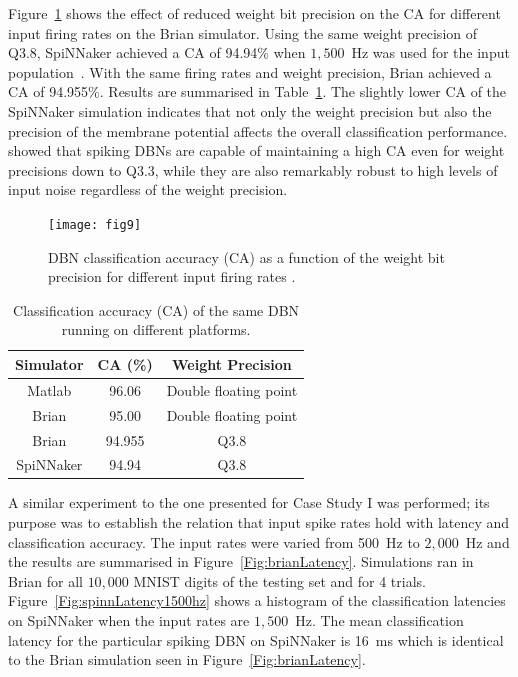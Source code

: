 \documentclass{frontiersENG} %
\begin{document}
Figure~\ref{Fig:brianCAfiringrate} shows the effect of reduced weight bit precision on the CA for different input firing rates on the Brian simulator.
Using the same weight precision of Q3.8, SpiNNaker achieved a CA of 94.94\% when $1,500$~Hz was used for the input population~\citep{Stromatias2015scalable}. With the same firing rates and weight precision, Brian achieved a CA of 94.955\%. Results are summarised in Table~\ref{tab:casimulators}.
The slightly lower CA of the SpiNNaker simulation indicates that not only the weight precision but also the precision of the membrane potential affects the overall classification performance.    
\citet{stromatias2015robustness} showed that spiking DBNs are capable of maintaining a high CA even for weight precisions down to Q3.3, while they are also remarkably robust to high levels of input noise regardless of the weight precision. 
\begin{figure}[hbt!]
	\centering
	\texttt{[image: fig9]}
	\caption{DBN classification accuracy (CA) as a function of the weight bit precision for different input firing rates \citep{stromatias2015robustness}.}
	\label{Fig:brianCAfiringrate}
\end{figure} 


\begin{table}[h]
	\caption{Classification accuracy (CA) of the same DBN running on different platforms.}
	\begin{center}
    \bgroup
    \def\arraystretch{1.4}
		\begin{tabular} {c c c}
			Simulator & CA (\%) & Weight Precision \\
			\hline
			Matlab & 96.06 & Double floating point\\
			Brian & 95.00 & Double floating point\\
			Brian & 94.955 & Q3.8\\
			SpiNNaker & 94.94 & Q3.8\\
		\end{tabular}
    \egroup
		\label{tab:casimulators}
	\end{center}
\end{table}

A similar experiment to the one presented for Case Study I was performed; its purpose was to establish the relation that input spike rates hold with latency and classification accuracy.
The input rates were varied from 500~Hz to $2,000$~Hz and the results are summarised in Figure~\ref{Fig:brianLatency}. Simulations ran in Brian for all $10,000$ MNIST digits of the testing set and for 4 trials. Figure~\ref{Fig:spinnLatency1500hz} shows a histogram of the classification latencies on SpiNNaker when the input rates are $1,500$~Hz. The mean classification latency for the particular spiking DBN on SpiNNaker is 16~ms which is identical to the Brian simulation seen in Figure~\ref{Fig:brianLatency}.
\end{document}
